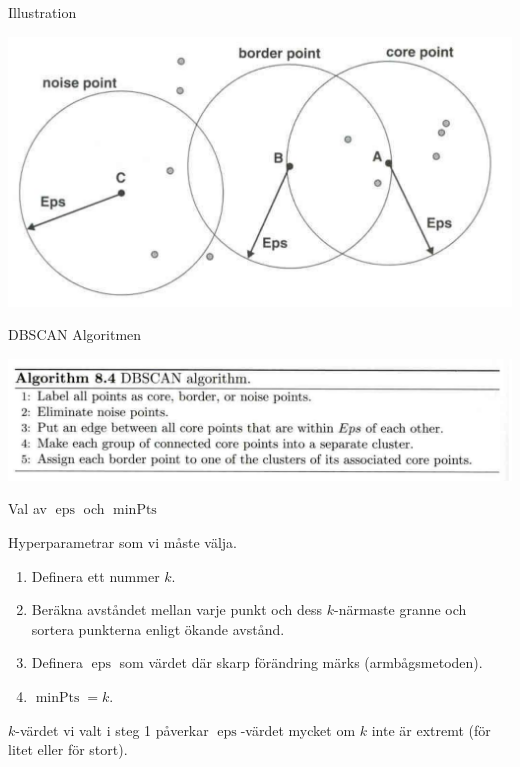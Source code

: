 \documentclass[10pt,english]{beamer}
\begin{document}
\begin{frame}{Illustration}
    
    \includegraphics[width=\textwidth]{figs/DBSCAN_obs_class.png}

\end{frame}

\begin{frame}{DBSCAN Algoritmen}

    \includegraphics[width=\textwidth]{figs/DBSCAN algoritm.png}
    
\end{frame}

\begin{frame}{Val av $\operatorname{eps}$ och $\operatorname{minPts}$}

    Hyperparametrar som vi måste välja.
    \begin{enumerate}
        \item Definera ett nummer $k$.
        \item Beräkna avståndet mellan varje punkt och dess $k$-närmaste granne och sortera punkterna enligt ökande avstånd.
        \item Definera $\operatorname{eps}$ som värdet där skarp förändring märks (armbågsmetoden).
        \item $\operatorname{minPts} = k$.
    \end{enumerate}
    $k$-värdet vi valt i steg 1 påverkar  $\operatorname{eps}$-värdet mycket om $k$ inte är extremt (för litet eller för stort).
    
\end{frame}
\end{document}
